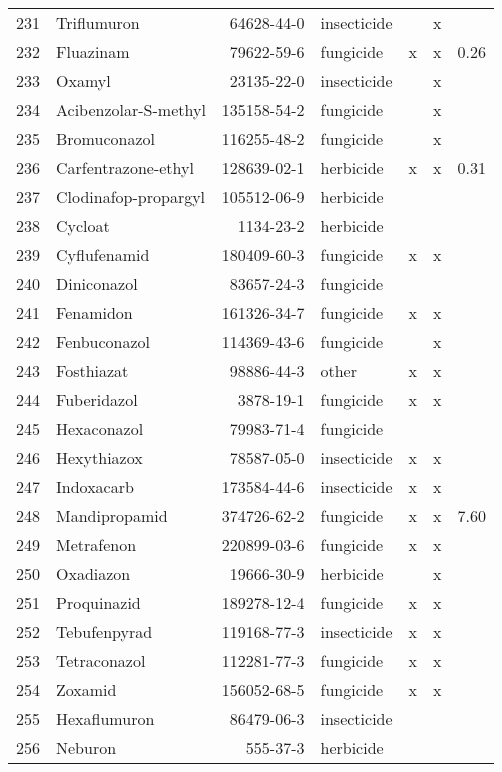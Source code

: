 \begin{longtable}{lp{3cm}rlp{0.5cm}p{0.5cm}p{1cm}}
  231 & Triflumuron & 64628-44-0 & insecticide &  & x &  \\ 
  232 & Fluazinam & 79622-59-6 & fungicide & x & x & 0.26 \\ 
  233 & Oxamyl & 23135-22-0 & insecticide &  & x &  \\ 
  234 & Acibenzolar-S-methyl & 135158-54-2 & fungicide &  & x &  \\ 
  235 & Bromuconazol & 116255-48-2 & fungicide &  & x &  \\ 
  236 & Carfentrazone-ethyl & 128639-02-1 & herbicide & x & x & 0.31 \\ 
  237 & Clodinafop-propargyl & 105512-06-9 & herbicide &  &  &  \\ 
  238 & Cycloat & 1134-23-2 & herbicide &  &  &  \\ 
  239 & Cyflufenamid & 180409-60-3 & fungicide & x & x &  \\ 
  240 & Diniconazol & 83657-24-3 & fungicide &  &  &  \\ 
  241 & Fenamidon & 161326-34-7 & fungicide & x & x &  \\ 
  242 & Fenbuconazol & 114369-43-6 & fungicide &  & x &  \\ 
  243 & Fosthiazat & 98886-44-3 & other & x & x &  \\ 
  244 & Fuberidazol & 3878-19-1 & fungicide & x & x &  \\ 
  245 & Hexaconazol & 79983-71-4 & fungicide &  &  &  \\ 
  246 & Hexythiazox & 78587-05-0 & insecticide & x & x &  \\ 
  247 & Indoxacarb & 173584-44-6 & insecticide & x & x &  \\ 
  248 & Mandipropamid & 374726-62-2 & fungicide & x & x & 7.60 \\ 
  249 & Metrafenon & 220899-03-6 & fungicide & x & x &  \\ 
  250 & Oxadiazon & 19666-30-9 & herbicide &  & x &  \\ 
  251 & Proquinazid & 189278-12-4 & fungicide & x & x &  \\ 
  252 & Tebufenpyrad & 119168-77-3 & insecticide & x & x &  \\ 
  253 & Tetraconazol & 112281-77-3 & fungicide & x & x &  \\ 
  254 & Zoxamid & 156052-68-5 & fungicide & x & x &  \\ 
  255 & Hexaflumuron & 86479-06-3 & insecticide &  &  &  \\ 
  256 & Neburon & 555-37-3 & herbicide &  &  &  \\ 

\end{longtable}
